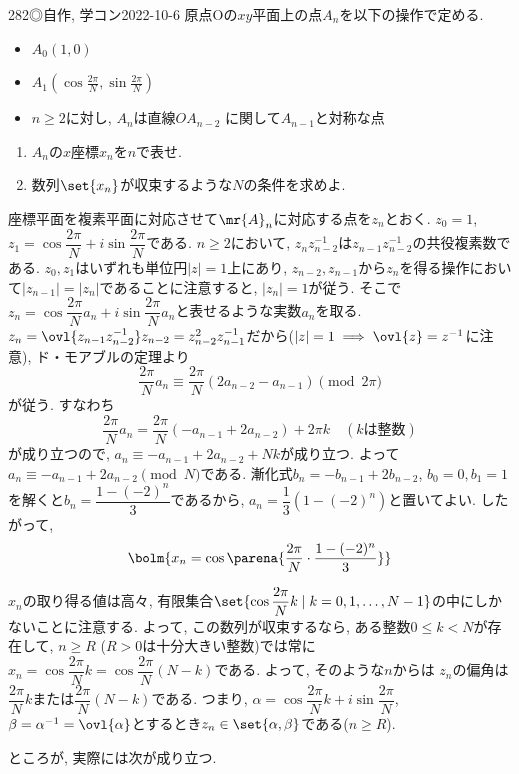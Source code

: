 \begin{prob}{282}{◎}{自作, 学コン2022-10-6}
原点Oの$xy$平面上の点$A_n$を以下の操作で定める. 
\begin{itemize}
\item $A_0(1,0)$
\item $A_1(\cos{\frac{2\pi}{N}}, \sin{\frac{2\pi}{N}} )$
\item $n\geq 2$に対し, $A_n$は直線$OA_{n-2}$ に関して$A_{n-1}$と対称な点
\end{itemize}
\begin{enumerate}
\item $A_n$の$x$座標$x_n$を$n$で表せ. 
\item 数列$\set{x_n}$が収束するような$N$の条件を求めよ. 
\end{enumerate}
\end{prob}


座標平面を複素平面に対応させて$\mr{A}_n$に対応する点を$z_n$とおく. $z_0=1$, $z_1 = \cos{\dfrac{2\pi}{N}} + i\sin{\dfrac{2\pi}{N}}$である.  $n\geq 2$において, $z_{n}z_{n-2}^{-1}$は$z_{n-1}z_{n-2}^{-1}$の共役複素数である. $z_0,z_1$はいずれも単位円$|z|=1$上にあり, $z_{n-2},z_{n-1}$から$z_n$を得る操作において$|z_{n-1}|=|z_n|$であることに注意すると, $|z_n|=1$が従う. そこで$z_n = \cos{\dfrac{2\pi}{N}a_n} + i\sin{\dfrac{2\pi}{N}a_n}$と表せるような実数$a_n$を取る. $z_n = \ovl{z_{n-1}z_{n-2}^{-1}}z_{n-2} = z_{n-2}^{2}z_{n-1}^{-1}$だから($|z|=1\implies \ovl{z} = z^{-1}$に注意), ド・モアブルの定理より
\[\dfrac{2\pi}{N}a_{n} \equiv \dfrac{2\pi}{N}(2a_{n-2} - a_{n-1})\pmod{2\pi}\]
が従う. すなわち
\[\dfrac{2\pi}{N}a_n = \dfrac{2\pi}{N}(-a_{n-1} + 2a_{n-2}) + 2\pi k\quad (kは整数)\]
が成り立つので, $a_{n} \equiv -a_{n-1} + 2a_{n-2} + Nk$が成り立つ.
よって$a_n \equiv -a_{n-1} + 2a_{n-2} \pmod{N}$である. 漸化式$b_{n} = -b_{n-1} + 2b_{n-2}$, $b_0=0, b_1=1$を解くと$b_n = \dfrac{1-(-2)^n}{3}$であるから, $a_n = \dfrac{1}{3}(1-(-2)^n)$と置いてよい. したがって, 
\[\bolm{x_n = \cos{\parena{\dfrac{2\pi}{N}\cdot \dfrac{1-(-2)^n}{3}}}}\]


$x_n$の取り得る値は高々, 有限集合$\set{\cos{\dfrac{2\pi}{N}k}\mid k=0,1,\dots, N-1}$の中にしかないことに注意する. 
よって, この数列が収束するなら, ある整数$0\leq k < N$が存在して, $n\geq R$ ($R>0$は十分大きい整数)では常に$x_n = \cos{\dfrac{2\pi}{N}k} = \cos{\dfrac{2\pi}{N}(N-k)}$である. よって, そのような$n$からは $z_n$の偏角は$\dfrac{2\pi}{N}k$または$\dfrac{2\pi}{N}(N-k)$である. つまり, $\alpha = \cos{\dfrac{2\pi}{N}k} + i\sin{\dfrac{2\pi}{N}}$, $\beta = \alpha^{-1} = \ovl{\alpha}$とするとき$z_n \in \set{\alpha,\beta}$である($n\geq R$). \par 
ところが, 実際には次が成り立つ. 
 
